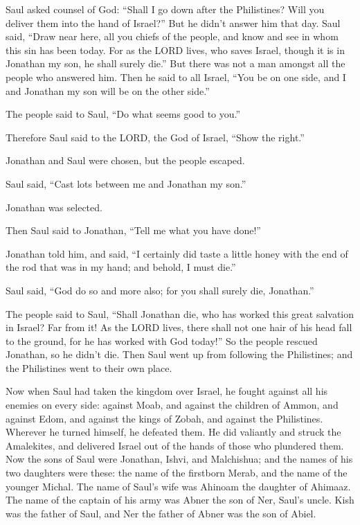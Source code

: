  Saul asked counsel of God: ``Shall I go down after the
Philistines? Will you deliver them into the hand of Israel?'' But he
didn't answer him that day.  Saul said, ``Draw near here,
all you chiefs of the people, and know and see in whom this sin has been
today.  For as the LORD lives, who saves Israel, though it
is in Jonathan my son, he shall surely die.'' But there was not a man
amongst all the people who answered him.  Then he said to
all Israel, ``You be on one side, and I and Jonathan my son will be on
the other side.''

The people said to Saul, ``Do what seems good to you.''

 Therefore Saul said to the LORD, the God of Israel, ``Show
the right.''

Jonathan and Saul were chosen, but the people escaped.

 Saul said, ``Cast lots between me and Jonathan my son.''

Jonathan was selected.

 Then Saul said to Jonathan, ``Tell me what you have
done!''

Jonathan told him, and said, ``I certainly did taste a little honey with
the end of the rod that was in my hand; and behold, I must die.''

 Saul said, ``God do so and more also; for you shall surely
die, Jonathan.''

 The people said to Saul, ``Shall Jonathan die, who has
worked this great salvation in Israel? Far from it! As the LORD lives,
there shall not one hair of his head fall to the ground, for he has
worked with God today!'' So the people rescued Jonathan, so he didn't
die.  Then Saul went up from following the Philistines; and
the Philistines went to their own place.

 Now when Saul had taken the kingdom over Israel, he fought
against all his enemies on every side: against Moab, and against the
children of Ammon, and against Edom, and against the kings of Zobah, and
against the Philistines. Wherever he turned himself, he defeated them.
 He did valiantly and struck the Amalekites, and delivered
Israel out of the hands of those who plundered them.  Now
the sons of Saul were Jonathan, Ishvi, and Malchishua; and the names of
his two daughters were these: the name of the firstborn Merab, and the
name of the younger Michal.  The name of Saul's wife was
Ahinoam the daughter of Ahimaaz. The name of the captain of his army was
Abner the son of Ner, Saul's uncle.  Kish was the father of
Saul, and Ner the father of Abner was the son of Abiel.

